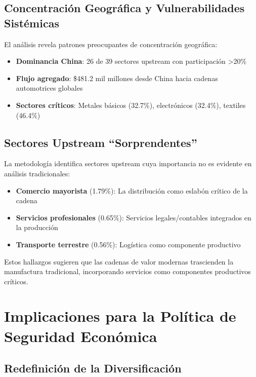 \documentclass[12pt,a4paper]{article}
\begin{document}
\subsection{Concentración Geográfica y Vulnerabilidades Sistémicas}

El análisis revela patrones preocupantes de concentración geográfica:

\begin{itemize}
    \item \textbf{Dominancia China}: 26 de 39 sectores upstream con participación >20\%
    \item \textbf{Flujo agregado}: \$481.2 mil millones desde China hacia cadenas automotrices globales
    \item \textbf{Sectores críticos}: Metales básicos (32.7\%), electrónicos (32.4\%), textiles (46.4\%)
\end{itemize}

\subsection{Sectores Upstream ``Sorprendentes''}

La metodología identifica sectores upstream cuya importancia no es evidente en análisis tradicionales:

\begin{itemize}
    \item \textbf{Comercio mayorista} (1.79\%): La distribución como eslabón crítico de la cadena
    \item \textbf{Servicios profesionales} (0.65\%): Servicios legales/contables integrados en la producción
    \item \textbf{Transporte terrestre} (0.56\%): Logística como componente productivo
\end{itemize}

Estos hallazgos sugieren que las cadenas de valor modernas trascienden la manufactura tradicional, incorporando servicios como componentes productivos críticos.

\section{Implicaciones para la Política de Seguridad Económica}

\subsection{Redefinición de la Diversificación}
\end{document}

